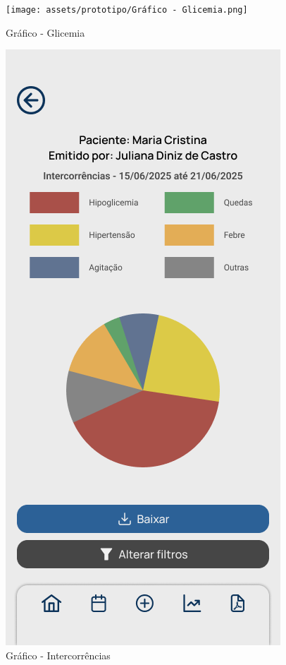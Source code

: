 \begin{figure}[!htbp]
	\centering
	\texttt{[image: assets/prototipo/Gráfico - Glicemia.png]}
	\caption{Gráfico - Glicemia}
	\label{grafico_glicemia}
\end{figure}

\begin{figure}[!htbp]
	\centering
	\includegraphics[width=0.6\linewidth]{assets/prototipo/Gráfico - Intercorrências.png}
	\caption{Gráfico - Intercorrências}
	\label{grafico_intercorrencias}
\end{figure}

